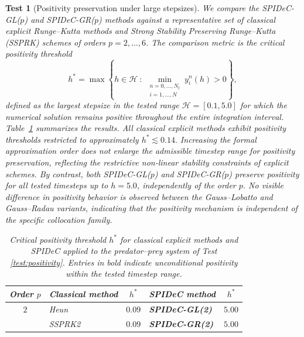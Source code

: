 \documentclass[a4paper,num-refs]{oup-contemporary-spidec}
\newtheorem{testcase}{Test} %
\begin{document}
\begin{testcase}[Positivity preservation under large stepsizes]
We compare the SPIDeC-GL($p$) and SPIDeC-GR($p$) methods against 
a representative set of classical explicit Runge--Kutta methods and 
Strong Stability Preserving Runge--Kutta (SSPRK) schemes of orders
$p=2,\dots,6$. 
The comparison metric is the \emph{critical positivity threshold} 
\begin{equation*}
    h^*=\max\left\{h\in \mathcal{H} \ : \ \min_{\substack{n=0,\dots,N_t \\ i=1,\dots,N}}y_i^n(h) > 0 \right\},
\end{equation*}
defined as the largest stepsize in the tested range $\mathcal{H}=[0.1, 5.0]$ for which the numerical solution remains positive throughout the entire integration interval.  Table~\ref{tab:positivity_comparison} summarizes the results. 
All classical explicit methods exhibit positivity thresholds 
restricted to approximately $h^* \lesssim 0.14.$
Increasing the formal approximation order does not enlarge the 
admissible timestep range for positivity preservation, reflecting 
the restrictive non-linear stability constraints of explicit schemes. 
By contrast, both SPIDeC-GL($p$) and SPIDeC-GR($p$) preserve positivity 
for all tested timesteps up to $h=5.0$, independently of the order $p$. 
No visible difference in positivity behavior is observed between 
the Gauss--Lobatto and Gauss--Radau variants, indicating that the 
positivity mechanism is independent of the specific collocation family.

\begin{table}[htb]
    \centering
    \caption{
    Critical positivity threshold $h^*$ for classical explicit methods 
    and SPIDeC applied to the predator--prey 
    system of Test \ref{test:positivity}. 
    Entries in bold indicate unconditional positivity within the 
    tested timestep range.
    }
    \label{tab:positivity_comparison}
    
    \small
    \setlength{\tabcolsep}{6pt}
    
    \begin{tabular}{c | lc | lc}
    \toprule
    Order $p$ 
    & Classical method & $h^*$ 
    & SPIDeC method & $h^*$ \\
    \midrule
    
    $2$  
    & Heun~\cite[Table 1.1]{Hairer_I} 
    & $0.09$ 
    & \textbf{SPIDeC-GL(2)} 
    & $\bm{5.00}$ \\
    
    & SSPRK2~\cite[Equation 2.15]{ShuOsher_1988} 
    & $0.09$ 
    & \textbf{SPIDeC-GR(2)} 
    & $\bm{5.00}$ \\
    

\end{tabular}
\end{table}
\end{testcase}
\end{document}
